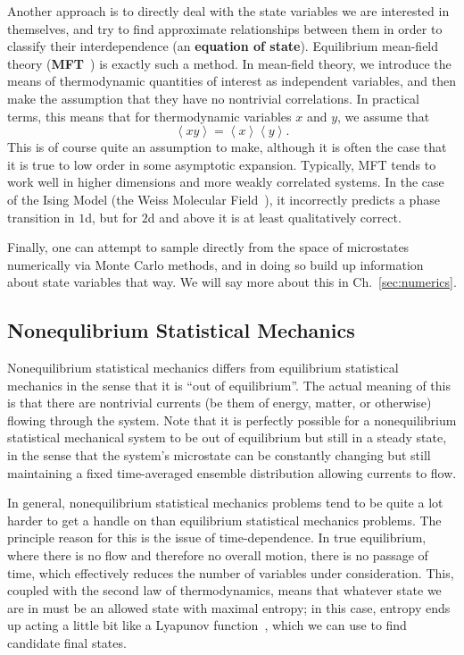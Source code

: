 Another approach is to directly deal with the state variables we are interested in themselves,
and try to find approximate relationships between them in order to classify their interdependence (an
\textbf{equation of state}). Equilibrium mean-field theory
(\textbf{MFT}~\cite{honig1999}) is exactly such a method.
In mean-field theory, we introduce the means of thermodynamic quantities of interest as independent
variables, and then make the assumption that they have no nontrivial correlations. In practical terms,
this means that for thermodynamic variables $x$ and $y$, we assume that
\begin{equation}
 \left\langle x y \right\rangle = \left\langle x  \right\rangle \left\langle y \right\rangle.
\end{equation}
This is of course quite an assumption to make, although it is often the case that it is true to low
order in some asymptotic expansion. Typically, MFT tends to work well in higher dimensions and more
weakly correlated systems. In the case of the Ising Model (the Weiss Molecular Field~\cite{van1945}), it incorrectly predicts a phase transition
in $1$d, but for $2$d and above it is at least qualitatively correct.

Finally, one can attempt to sample directly from the space of microstates numerically via Monte Carlo
methods, and in doing so build up information about state variables that way.
We will say more about this in Ch.~\ref{sec:numerics}.

\subsection{Nonequlibrium Statistical Mechanics}
Nonequilibrium statistical mechanics differs from equilibrium statistical mechanics in the sense that
it is ``out of equilibrium''. The actual meaning of this is that there are nontrivial currents
(be them of energy, matter, or otherwise) flowing through the system. Note that it is perfectly
possible for a nonequilibrium statistical mechanical system to be out of equilibrium but still in a
steady state, in the sense that the system's microstate can be constantly changing but still
maintaining a fixed time-averaged ensemble distribution allowing currents to flow.

In general, nonequilibrium statistical mechanics problems tend to be quite a lot harder to get 
a handle on than equilibrium statistical mechanics problems. The principle reason for this is the
issue of time-dependence. In true equilibrium, where there is no flow and therefore no overall motion,
there is no passage of time, which effectively reduces the number of variables under consideration. This, coupled with the second law of thermodynamics, means that whatever state we are
in must be an allowed state with maximal entropy; in this case, entropy ends up acting a little bit
like a Lyapunov function~\cite{pukdeboon2011}, which we can use to find candidate final states. 

